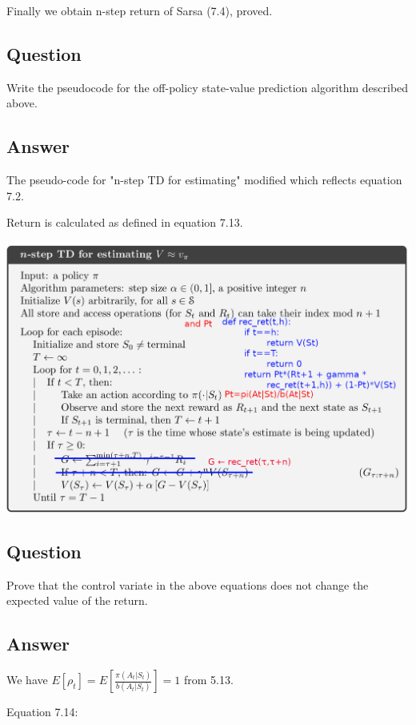 \documentclass[11pt]{article}
\begin{document}
    Finally we obtain n-step return of Sarsa (7.4), proved.

    \subsection{Question}

    Write the pseudocode for the off-policy state-value prediction algorithm described above.

    \subsection*{Answer}

    The pseudo-code for "n-step TD for estimating" modified which reflects equation 7.2.

    Return is calculated as defined in equation 7.13.

    \includegraphics[scale=1]{figure_7_5}

    \subsection{Question}

    Prove that the control variate in the above equations does not change the expected value of the return.

    \subsection*{Answer}

    We have $ E[\rho_t] = E[\frac{\pi(A_t|S_t)}{b(A_t|S_t)}] = 1 $ from 5.13.

    \noindent Equation 7.14:
\end{document}
